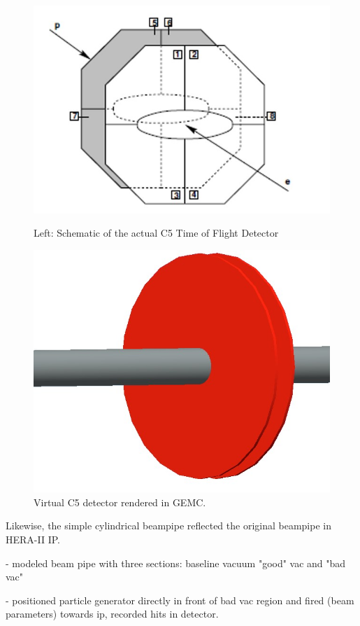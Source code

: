 \begin{figure}
	\centering
	\begin{minipage}{0.45\textwidth}
		\centering
		\includegraphics[width=.75\textwidth]{../../img/hera_c5.jpg}
		\caption {Left: Schematic of the actual C5 Time of Flight Detector  }
		
	\end{minipage}\hfill
	\begin{minipage}{0.45\textwidth}
		\centering	\includegraphics[width=.75\textwidth]{../../img/C5_gemc}	
		\caption {Virtual C5 detector rendered in GEMC.}
	\end{minipage}
	
\end{figure}

Likewise, the simple cylindrical beampipe reflected the original beampipe in HERA-II IP.  

- modeled beam pipe with three sections: baseline vacuum "good" vac and "bad vac" 

- positioned particle generator directly in front of bad vac region and fired (beam parameters) towards ip, recorded hits in detector.

